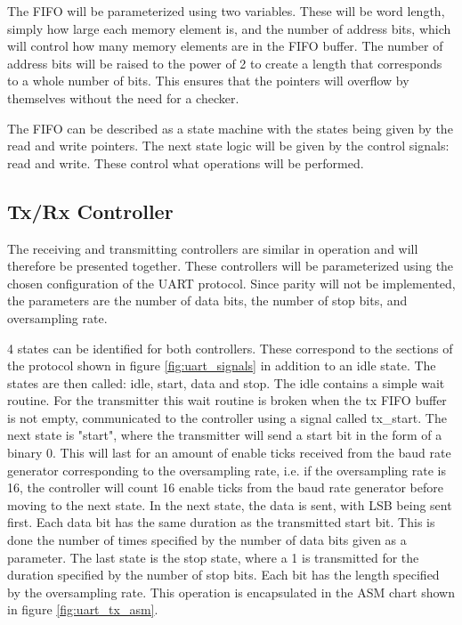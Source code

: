 \documentclass[./dissertation.tex]{subfiles}
\begin{document}
The FIFO will be parameterized using two variables. These will be word length, simply how large each memory element is, and the number of address bits, which will control how many memory elements are in the FIFO buffer. The number of address bits will be raised to the power of 2 to create a length that corresponds to a whole number of bits. This ensures that the pointers will overflow by themselves without the need for a checker. 

The FIFO can be described as a state machine with the states being given by the read and write pointers. The next state logic will be given by the control signals: read and write. These control what operations will be performed. 

\subsection{Tx/Rx Controller}
The receiving and transmitting controllers are similar in operation and will therefore be presented together. These controllers will be parameterized using the chosen configuration of the UART protocol. Since parity will not be implemented, the parameters are the number of data bits, the number of stop bits, and oversampling rate.

4 states can be identified for both controllers. These correspond to the sections of the protocol shown in figure \ref{fig:uart_signals} in addition to an idle state. The states are then called: idle, start, data and stop. The idle contains a simple wait routine. For the transmitter this wait routine is broken when the tx FIFO buffer is not empty, communicated to the controller using a signal called tx\_start. The next state is "start", where the transmitter will send a start bit in the form of a binary 0. This will last for an amount of enable ticks received from the baud rate generator corresponding to the oversampling rate, i.e. if the oversampling rate is 16, the controller will count 16 enable ticks from the baud rate generator before moving to the next state. In the next state, the data is sent, with LSB being sent first. Each data bit has the same duration as the transmitted start bit. This is done the number of times specified by the number of data bits given as a parameter. The last state is the stop state, where a 1 is transmitted for the duration specified by the number of stop bits. Each bit has the length specified by the oversampling rate. This operation is encapsulated in the ASM chart shown in figure \ref{fig:uart_tx_asm}.
\end{document}
